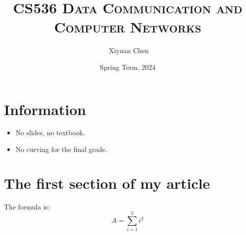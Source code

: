 \documentclass{../../ainote}
\author{\ccLogo \,\,Xiyuan Chen}
\title{\textsc{CS536 Data Communication and Computer Networks}}
\date{Spring Term, 2024}
\begin{document}
\maketitle
\doclicenseThis
\section*{Information}
\begin{itemize}
	\item No slides, no textbook.
	\item No curving for the final grade.
\end{itemize}
\tableofcontents
\newpage

\section{The first section of my article}
\begin{info}
    The formula is: 
    \begin{equation}
    \label{eqa:1}
        A=\sum_{i=1}^3 i^2
    \end{equation}
\end{info}
\end{document}
